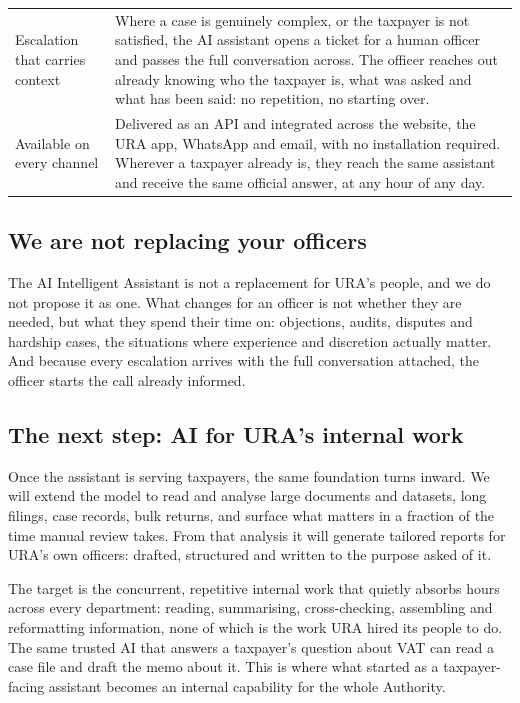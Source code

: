 \documentclass[11pt,a4paper]{article}
\begin{document}
\begin{longtable}{@{}>{\bfseries\raggedright}p{4cm} p{10.7cm}@{}}
Escalation that carries context &
Where a case is genuinely complex, or the taxpayer is not satisfied, the AI assistant opens a ticket for a human officer and passes the full conversation across. The officer reaches out already knowing who the taxpayer is, what was asked and what has been said: no repetition, no starting over. \\[0.6em]

Available on every channel &
Delivered as an API and integrated across the website, the URA app, WhatsApp and email, with no installation required. Wherever a taxpayer already is, they reach the same assistant and receive the same official answer, at any hour of any day. \\
\bottomrule
\end{longtable}

\subsection*{We are not replacing your officers}

The AI Intelligent Assistant is not a replacement for URA's people, and we do not propose it as one. What changes for an officer is not whether they are needed, but what they spend their time on: objections, audits, disputes and hardship cases, the situations where experience and discretion actually matter. And because every escalation arrives with the full conversation attached, the officer starts the call already informed.

\subsection*{The next step: AI for URA's internal work}

Once the assistant is serving taxpayers, the same foundation turns inward. We will extend the model to read and analyse large documents and datasets, long filings, case records, bulk returns, and surface what matters in a fraction of the time manual review takes. From that analysis it will generate tailored reports for URA's own officers: drafted, structured and written to the purpose asked of it.

The target is the concurrent, repetitive internal work that quietly absorbs hours across every department: reading, summarising, cross-checking, assembling and reformatting information, none of which is the work URA hired its people to do. The same trusted AI that answers a taxpayer's question about VAT can read a case file and draft the memo about it. This is where what started as a taxpayer-facing assistant becomes an internal capability for the whole Authority.
\end{document}
